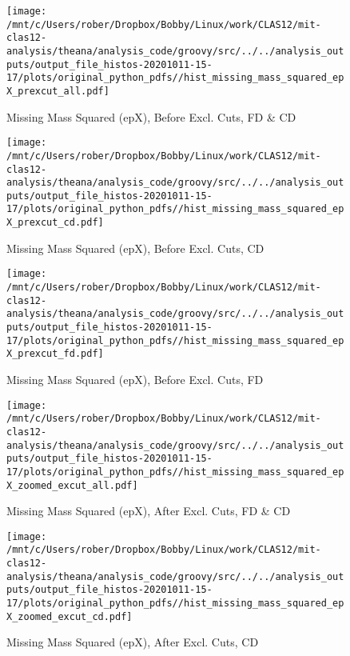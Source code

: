 \documentclass{article}
\begin{document}
\begin{landscape}
\begin{figure}[h]
        \texttt{[image: /mnt/c/Users/rober/Dropbox/Bobby/Linux/work/CLAS12/mit-clas12-analysis/theana/analysis\_code/groovy/src/../../analysis\_outputs/output\_file\_histos-20201011-15-17/plots/original\_python\_pdfs//hist\_missing\_mass\_squared\_epX\_prexcut\_all.pdf]}
        \captionsetup{textformat=empty,labelformat=blank}
        \caption{Missing Mass Squared (epX), Before Excl. Cuts, FD \& CD}
    \end{figure}
    \clearpage
    
    \begin{figure}[h]
        \centering

        \texttt{[image: /mnt/c/Users/rober/Dropbox/Bobby/Linux/work/CLAS12/mit-clas12-analysis/theana/analysis\_code/groovy/src/../../analysis\_outputs/output\_file\_histos-20201011-15-17/plots/original\_python\_pdfs//hist\_missing\_mass\_squared\_epX\_prexcut\_cd.pdf]}
        \captionsetup{textformat=empty,labelformat=blank}
        \caption{Missing Mass Squared (epX), Before Excl. Cuts, CD}
    \end{figure}
    \clearpage
    
    \begin{figure}[h]
        \centering

        \texttt{[image: /mnt/c/Users/rober/Dropbox/Bobby/Linux/work/CLAS12/mit-clas12-analysis/theana/analysis\_code/groovy/src/../../analysis\_outputs/output\_file\_histos-20201011-15-17/plots/original\_python\_pdfs//hist\_missing\_mass\_squared\_epX\_prexcut\_fd.pdf]}
        \captionsetup{textformat=empty,labelformat=blank}
        \caption{Missing Mass Squared (epX), Before Excl. Cuts, FD}
    \end{figure}
    \clearpage
    
    \begin{figure}[h]
        \centering

        \texttt{[image: /mnt/c/Users/rober/Dropbox/Bobby/Linux/work/CLAS12/mit-clas12-analysis/theana/analysis\_code/groovy/src/../../analysis\_outputs/output\_file\_histos-20201011-15-17/plots/original\_python\_pdfs//hist\_missing\_mass\_squared\_epX\_zoomed\_excut\_all.pdf]}
        \captionsetup{textformat=empty,labelformat=blank}
        \caption{Missing Mass Squared (epX), After Excl. Cuts, FD \& CD}
    \end{figure}
    \clearpage
    
    \begin{figure}[h]
        \centering

        \texttt{[image: /mnt/c/Users/rober/Dropbox/Bobby/Linux/work/CLAS12/mit-clas12-analysis/theana/analysis\_code/groovy/src/../../analysis\_outputs/output\_file\_histos-20201011-15-17/plots/original\_python\_pdfs//hist\_missing\_mass\_squared\_epX\_zoomed\_excut\_cd.pdf]}
        \captionsetup{textformat=empty,labelformat=blank}
        \caption{Missing Mass Squared (epX), After Excl. Cuts, CD}
    \end{figure}
    \clearpage
    

\end{landscape}
\end{document}
